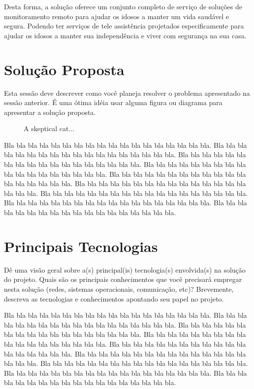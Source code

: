 \documentclass{acm_proc_article-sp}
\newcommand{\fig}[4][htb]{
  \begin{figure}[#1]
    {\centering{\texttt{[image: fig/\#2]}}\par}
    \caption{#3}
    \label{fig:#2}
  \end{figure}
}
\begin{document}
Desta forma, a solução oferece um conjunto completo de serviço de soluções de monitoramento remoto para ajudar os idosos a manter um vida saudável e segura. Podendo ter serviços de tele assistência projetados especificamente para ajudar os idosos a manter sua independência e viver com segurança na sua casa.

\section{Solução Proposta}

Esta sessão deve descrever como você planeja resolver o problema apresentado na sessão anterior.
É uma ótima idéia usar alguma figura ou diagrama para apresentar a solução proposta.

\fig{cat}{A skeptical cat...}{width=0.8\columnwidth}

Bla bla bla bla bla bla bla bla bla bla bla bla bla bla bla bla bla bla.
Bla bla bla bla bla bla bla bla bla bla bla bla bla bla bla bla bla bla.
Bla bla bla bla bla bla bla bla bla bla bla bla bla bla bla bla bla bla.
Bla bla bla bla bla bla bla bla bla bla bla bla bla bla bla bla bla bla.
Bla bla bla bla bla bla bla bla bla bla bla bla bla bla bla bla bla bla.
Bla bla bla bla bla bla bla bla bla bla bla bla bla bla bla bla bla bla.
Bla bla bla bla bla bla bla bla bla bla bla bla bla bla bla bla bla bla.
Bla bla bla bla bla bla bla bla bla bla bla bla bla bla bla bla bla bla.
Bla bla bla bla bla bla bla bla bla bla bla bla bla bla bla bla bla bla.

\section{Principais Tecnologias}

Dê uma visão geral sobre a(s) principal(is) tecnologia(s) envolvida(s) na solução do projeto.
Quais são os principais conhecimentos que você precisará empregar nesta solução (redes, sistemas operacionais, comunicação, etc)?
Brevemente, descreva as tecnologias e conhecimentos apontando seu papel no projeto.

Bla bla bla bla bla bla bla bla bla bla bla bla bla bla bla bla bla bla.
Bla bla bla bla bla bla bla bla bla bla bla bla bla bla bla bla bla bla.
Bla bla bla bla bla bla bla bla bla bla bla bla bla bla bla bla bla bla.
Bla bla bla bla bla bla bla bla bla bla bla bla bla bla bla bla bla bla.
Bla bla bla bla bla bla bla bla bla bla bla bla bla bla bla bla bla bla.
Bla bla bla bla bla bla bla bla bla bla bla bla bla bla bla bla bla bla.
Bla bla bla bla bla bla bla bla bla bla bla bla bla bla bla bla bla bla.
Bla bla bla bla bla bla bla bla bla bla bla bla bla bla bla bla bla bla.
Bla bla bla bla bla bla bla bla bla bla bla bla bla bla bla bla bla bla.
\end{document}
